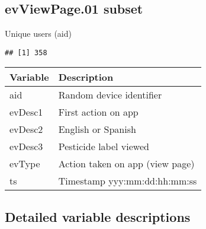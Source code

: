 \documentclass[
]{article}
\begin{document}
\hypertarget{evviewpage.01-subset}{%
\subsection{evViewPage.01 subset}\label{evviewpage.01-subset}}

Unique users (aid)

\begin{verbatim}
## [1] 358
\end{verbatim}

\begin{longtable}[]{@{}ll@{}}
\toprule
Variable & Description \\
\midrule
\endhead
aid & Random device identifier \\
evDesc1 & First action on app \\
evDesc2 & English or Spanish \\
evDesc3 & Pesticide label viewed \\
evType & Action taken on app (view page) \\
ts & Timestamp yyy:mm:dd:hh:mm:ss \\
\bottomrule
\end{longtable}

\hypertarget{detailed-variable-descriptions}{%
\subsection{Detailed variable
descriptions}\label{detailed-variable-descriptions}}
\end{document}

